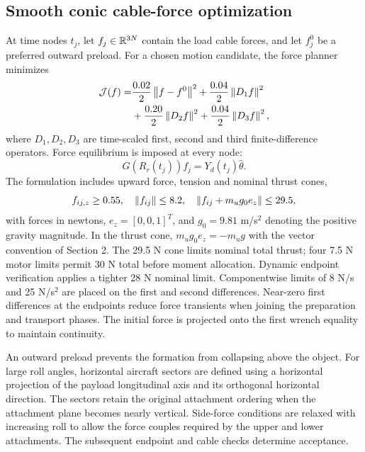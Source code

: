 \subsection{Smooth conic cable-force optimization}
At time nodes $t_j$, let $f_j\in\mathbb{R}^{3N}$ contain the load cable forces, and let $f_j^0$ be a preferred outward preload. For a chosen motion candidate, the force planner minimizes
\begin{equation}
 \begin{split}
 \mathcal{J}(f)=&\frac{0.02}{2}\left\lVert f-f^0\right\rVert^{2}
 +\frac{0.04}{2}\left\lVert D_1f\right\rVert^{2}\\
 &+\frac{0.20}{2}\left\lVert D_2f\right\rVert^{2}
 +\frac{0.04}{2}\left\lVert D_3f\right\rVert^{2},
 \end{split}
 \label{eq:objective}
\end{equation}
where $D_1,D_2,D_3$ are time-scaled first, second and third finite-difference operators. Force equilibrium is imposed at every node:
\begin{equation}
 G(R_r(t_j))f_j=Y_d(t_j)\hat\theta.
 \label{eq:equilibrium}
\end{equation}
The formulation includes upward force, tension and nominal thrust cones,
\begin{equation}
 f_{ij,z}\geq0.55,\quad \left\lVert f_{ij}\right\rVert\leq8.2,\quad
 \left\lVert f_{ij}+m_ug_0 e_z\right\rVert\leq29.5,
 \label{eq:cones}
\end{equation}
with forces in newtons, $e_z=[0,0,1]^T$, and $g_0=9.81$ m/s$^2$ denoting the positive gravity magnitude. In the thrust cone, $m_ug_0e_z=-m_u g$ with the vector convention of Section 2. The 29.5 N cone limits nominal total thrust; four 7.5 N motor limits permit 30 N total before moment allocation. Dynamic endpoint verification applies a tighter 28 N nominal limit. Componentwise limits of 8 N/s and 25 N/s$^2$ are placed on the first and second differences. Near-zero first differences at the endpoints reduce force transients when joining the preparation and transport phases. The initial force is projected onto the first wrench equality to maintain continuity.

An outward preload prevents the formation from collapsing above the object. For large roll angles, horizontal aircraft sectors are defined using a horizontal projection of the payload longitudinal axis and its orthogonal horizontal direction. The sectors retain the original attachment ordering when the attachment plane becomes nearly vertical. Side-force conditions are relaxed with increasing roll to allow the force couples required by the upper and lower attachments. The subsequent endpoint and cable checks determine acceptance.


